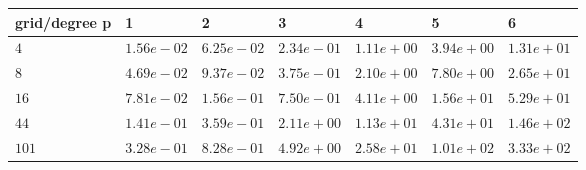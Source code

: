 \begin{tabular}{lllllll}
\hline
 grid/degree p   & 1          & 2          & 3          & 4          & 5          & 6          \\
\hline
 $4$             & $1.56e-02$ & $6.25e-02$ & $2.34e-01$ & $1.11e+00$ & $3.94e+00$ & $1.31e+01$ \\
 $8$             & $4.69e-02$ & $9.37e-02$ & $3.75e-01$ & $2.10e+00$ & $7.80e+00$ & $2.65e+01$ \\
 $16$            & $7.81e-02$ & $1.56e-01$ & $7.50e-01$ & $4.11e+00$ & $1.56e+01$ & $5.29e+01$ \\
 $44$            & $1.41e-01$ & $3.59e-01$ & $2.11e+00$ & $1.13e+01$ & $4.31e+01$ & $1.46e+02$ \\
 $101$           & $3.28e-01$ & $8.28e-01$ & $4.92e+00$ & $2.58e+01$ & $1.01e+02$ & $3.33e+02$ \\
\hline
\end{tabular}